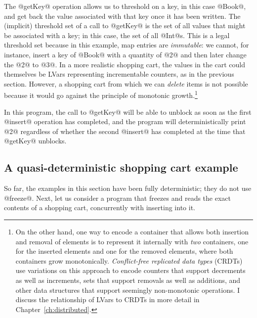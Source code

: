The @getKey@ operation allows us to threshold on a key, in this case
@Book@, and get back the value associated with that key once it has
been written.  The (implicit) threshold set of a call to @getKey@ is
the set of all values that might be associated with a key; in this
case, the set of all @Int@s.  This is a legal threshold set because in
this example, map entries are \emph{immutable}: we cannot, for
instance, insert a key of @Book@ with a quantity of @2@ and then later
change the @2@ to @3@.  In a more realistic shopping cart, the values
in the cart could themselves be LVars representing incrementable
counters, as in the previous section.    However, a shopping cart from
which we can \emph{delete} items is not possible because it would go
against the principle of monotonic growth.\footnote{On the other hand,
  one way to encode a container that allows both insertion and removal
  of elements is to represent it internally with \emph{two}
  containers, one for the inserted elements and one for the removed
  elements, where both containers grow monotonically.
  \emph{Conflict-free replicated data types} (CRDTs)~\cite{crdts} use
  variations on this approach to encode counters that support
  decrements as well as increments, sets that support removals as well
  as additions, and other data structures that support seemingly
  non-monotonic operations.  I discuss the relationship of LVars to
  CRDTs in more detail in Chapter~\ref{ch:distributed}.}

In this program, the call to @getKey@ will be able to unblock as soon
as the first @insert@ operation has completed, and the program will
deterministically print @2@ regardless of whether the second @insert@
has completed at the time that @getKey@ unblocks.

\subsection{A quasi-deterministic shopping cart example}

So far, the examples in this section have been fully deterministic;
they do not use @freeze@.  Next, let us consider a program that
freezes and reads the exact contents of a shopping cart, concurrently
with inserting into it.

\singlespacing

\doublespacing

